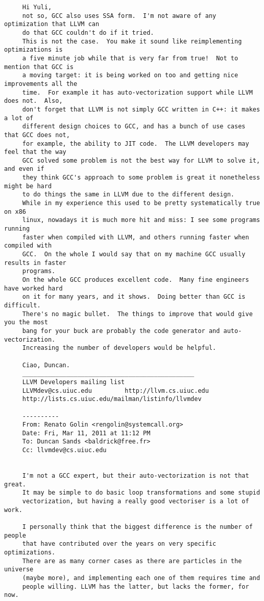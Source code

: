 \documentclass[a4paper,10pt]{article}
\begin{document}
\begin{verbatim}
     Hi Yuli,
     not so, GCC also uses SSA form.  I'm not aware of any optimization that LLVM can
     do that GCC couldn't do if it tried.
     This is not the case.  You make it sound like reimplementing optimizations is
     a five minute job while that is very far from true!  Not to mention that GCC is
     a moving target: it is being worked on too and getting nice improvements all the
     time.  For example it has auto-vectorization support while LLVM does not.  Also,
     don't forget that LLVM is not simply GCC written in C++: it makes a lot of
     different design choices to GCC, and has a bunch of use cases that GCC does not,
     for example, the ability to JIT code.  The LLVM developers may feel that the way
     GCC solved some problem is not the best way for LLVM to solve it, and even if
     they think GCC's approach to some problem is great it nonetheless might be hard
     to do things the same in LLVM due to the different design.
     While in my experience this used to be pretty systematically true on x86
     linux, nowadays it is much more hit and miss: I see some programs running
     faster when compiled with LLVM, and others running faster when compiled with
     GCC.  On the whole I would say that on my machine GCC usually results in faster
     programs.
     On the whole GCC produces excellent code.  Many fine engineers have worked hard
     on it for many years, and it shows.  Doing better than GCC is difficult.
     There's no magic bullet.  The things to improve that would give you the most
     bang for your buck are probably the code generator and auto-vectorization.
     Increasing the number of developers would be helpful.

     Ciao, Duncan.
     _______________________________________________
     LLVM Developers mailing list
     LLVMdev@cs.uiuc.edu         http://llvm.cs.uiuc.edu
     http://lists.cs.uiuc.edu/mailman/listinfo/llvmdev

     ----------
     From: Renato Golin <rengolin@systemcall.org>
     Date: Fri, Mar 11, 2011 at 11:12 PM
     To: Duncan Sands <baldrick@free.fr>
     Cc: llvmdev@cs.uiuc.edu


     I'm not a GCC expert, but their auto-vectorization is not that great.
     It may be simple to do basic loop transformations and some stupid
     vectorization, but having a really good vectoriser is a lot of work.

     I personally think that the biggest difference is the number of people
     that have contributed over the years on very specific optimizations.
     There are as many corner cases as there are particles in the universe
     (maybe more), and implementing each one of them requires time and
     people willing. LLVM has the latter, but lacks the former, for now.


\end{verbatim}
\end{document}
